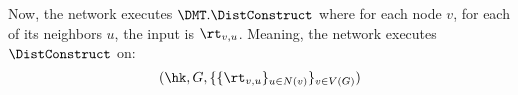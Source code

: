 Now, the network executes $\DMT.\DistConstruct$ where for each node $v$, for each of its neighbors $u$, the input is $\rt_{v,u}$. Meaning, the network executes $\DistConstruct$ on:
$$(\hk, G, \{\{\rt_{v,u}\}_{u\in N(v)}\}_{v\in V(G)})$$



